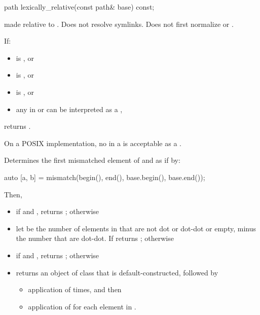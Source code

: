 %
\begin{itemdecl}
path lexically_relative(const path& base) const;
\end{itemdecl}

\begin{itemdescr}
\pnum
\returns
{} made relative to .
Does not resolve symlinks.
Does not first normalize  or .

\pnum
\effects
If:
\begin{itemize}
\item
{} is , or

\item
{} is , or

\item
{} is , or

\item
any  in
 or 
can be interpreted as a ,
\end{itemize}
returns .
\begin{note}
On a POSIX implementation, no  in a  is acceptable as a .
\end{note}
Determines the first mismatched element of  and 
as if by:
\begin{codeblock}
auto [a, b] = mismatch(begin(), end(), base.begin(), base.end());
\end{codeblock}
Then,
\begin{itemize}
\item if  and , returns ; otherwise
\item
  let  be the number of  elements in 
  that are not dot or dot-dot or empty, minus the number that are dot-dot.
If  returns ; otherwise
\item
  if  and ,
  returns ; otherwise
\item returns an object of class  that is default-constructed, followed by
\begin{itemize}
\item application of 
   times, and then
\item application of 
  for each element in .
\end{itemize}
\end{itemize}


\end{itemdescr}
